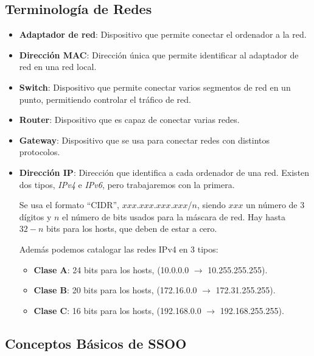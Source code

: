 \subsection{Terminología de Redes}
\begin{itemize}
        \item \textbf{Adaptador de red}: Dispositivo que permite conectar el ordenador a la red.
        \item \textbf{Dirección MAC}: Dirección única que permite identificar al adaptador de red en una red local.
        \item \textbf{Switch}: Dispositivo que permite conectar varios segmentos de red en un punto, permitiendo controlar el tráfico de red.
        \item \textbf{Router}: Dispositivo que es capaz de conectar varias redes.
        \item \textbf{Gateway}: Dispositivo que se usa para conectar redes con distintos protocolos.
        \item \textbf{Dirección IP}: Dirección que identifica a cada ordenador de una red. Existen dos tipos, \textit{IPv4} e \textit{IPv6}, pero trabajaremos con la primera. \par \noindent Se usa el formato ``CIDR'', \(xxx\).\(xxx\).\(xxx\).\(xxx\)/\(n\), siendo \(xxx\) un número de 3 dígitos y \(n\) el número de bits usados para la máscara de red. Hay hasta \(32-n\) bits para los hosts, que deben de estar a cero. \par \noindent Además podemos catalogar las redes IPv4 en 3 tipos:
              \begin{itemize}
                      \item  \textbf{Clase A}: 24 bits para los hosts, (10.0.0.0 \(\rightarrow\) 10.255.255.255).\item  \textbf{Clase B}: 20 bits para los hosts, (172.16.0.0 \(\rightarrow\) 172.31.255.255).\item \textbf{Clase C}: 16 bits para los hosts, (192.168.0.0 \(\rightarrow\) 192.168.255.255).
              \end{itemize}
\end{itemize}
\subsection{Conceptos Básicos de SSOO}
